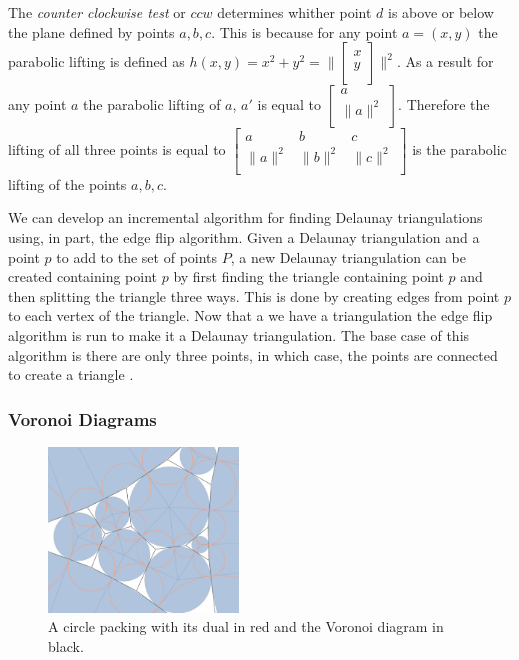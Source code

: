 \documentclass[11pt]{article}
\theoremstyle{definition}
\begin{document}
	The \emph{counter clockwise test} or $ccw$ determines whither point $d$ is above or below the plane defined by points $a,b,c$. 
	This is because for any point $a = (x,y)$ the parabolic lifting is defined as $h(x,y) = x^2 + y^2 = \| 
	\begin{bmatrix} 
		x \\
		y \\ 
	\end{bmatrix} 
	\|^2$.
	As a result for any point $a$ the parabolic lifting of $a$, $a'$ is equal to $
	\begin{bmatrix} 
		a \\ 
		\| a \|^2 \\ 
	\end{bmatrix}$. 
	Therefore the lifting of all three points is equal to
	$\begin{bmatrix}
    			a & b & c \\
    			\|a\|^2 & \|b\|^2 & \|c\|^2 \\
	\end{bmatrix}$ 
	is the parabolic lifting of the points $a,b,c$.

	We can develop an incremental algorithm for finding Delaunay triangulations using, in part, the edge flip algorithm.
	Given a Delaunay triangulation and a point $p$ to add to the set of points $P$, a new Delaunay triangulation can be created containing point $p$ by first finding the triangle containing point $p$ and then splitting the triangle three ways. 
	This is done by creating edges from point $p$ to each vertex of the triangle. 
	Now that a we have a triangulation the edge flip algorithm is run to make it a Delaunay triangulation. 
	The base case of this algorithm is there are only three points, in which case, the points are connected to create a triangle \cite{meshGeneration}. 

\subsubsection{Voronoi Diagrams}

	\begin{figure}
  		\begin{center}
    		\includegraphics[scale=.18,width=0.45\textwidth]{voronoi}
  		\end{center}
  		\caption{A circle packing with its dual in red and the Voronoi diagram in black.}
	\end{figure}
\end{document}
